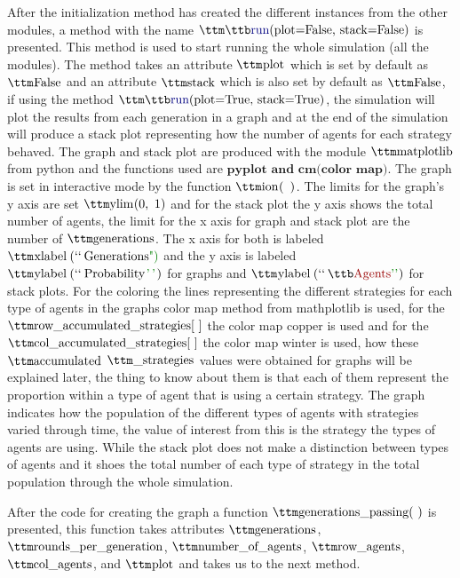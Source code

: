 After the initialization method has created the different instances from the other modules, a method with the name $\pythoninline{run(plot=False, stack=False)}$ is presented. This method is used to start running the whole simulation (all the modules). The method takes an attribute $\pythoninline{plot}$ which is set by default as $\pythoninline{False}$ and an attribute $\pythoninline{stack}$ which is also set by default as $\pythoninline{False}$, if using the method $\pythoninline{run(plot=True, stack=True)}$, the simulation will plot the results from each generation in a graph and at the end of the simulation will produce a stack plot representing how the number of agents for each strategy behaved. The graph and stack plot are produced with the module $\pythoninline{matplotlib}$ from python and the functions used are $\textbf{pyplot and cm(color map)}$. The graph is set in interactive mode by the function $\pythoninline{ion( )}$. The limits for the graph's y axis are set $\pythoninline{ylim(0, 1)}$ and for the stack plot the y axis shows the total number of agents, the limit for the x axis for graph and stack plot are the number of $\pythoninline{generations}$. The x axis for both is labeled $\pythoninline{xlabel(``Generations")}$ and the y axis is labeled $\pythoninline{ylabel(``Probability'')}$ for graphs and $\pythoninline{ylabel(``Agents'')}$ for stack plots. For the coloring the lines representing the different strategies for each type of agents in the graphs color map method from mathplotlib is used, for the $\pythoninline{row\_accumulated\_strategies[ ]}$ the color map copper is used and for the $\pythoninline{col\_accumulated\_strategies[ ]}$ the color map winter is used, how these $\pythoninline{accumulated}$ $\pythoninline{\_strategies}$ values were obtained for graphs will be explained later, the thing to know about them is that each of them represent the proportion within a type of agent that is using a certain strategy. The graph indicates how the population of the different types of agents with strategies varied through time, the value of interest from this is the strategy the types of agents are using. While the stack plot does not make a distinction between types of agents and it shoes the total number of each type of strategy in the total population through the whole simulation.

After the code for creating the graph a function $\pythoninline{generations\_passing( )}$ is presented, this function takes attributes $\pythoninline{generations}$, $\pythoninline{rounds\_per\_generation}$, $\pythoninline{number\_of\_agents}$, $\pythoninline{row\_agents}$, $\pythoninline{col\_agents}$, and $\pythoninline{plot}$ and takes us to the next method.


